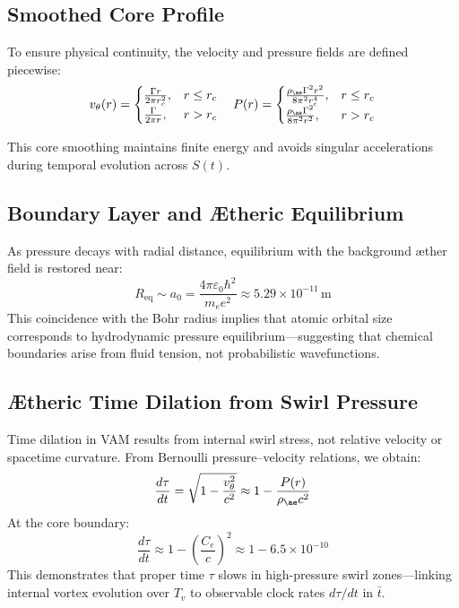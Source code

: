 \documentclass[12pt]{article}
\begin{document}
\subsection{Smoothed Core Profile}

To ensure physical continuity, the velocity and pressure fields are defined piecewise:
\[
v_\theta(r) =
\begin{cases}
\frac{\Gamma r}{2\pi r_c^2}, & r \leq r_c \\
\frac{\Gamma}{2\pi r}, & r > r_c
\end{cases}
\quad
P(r) =
\begin{cases}
\frac{\rho_{\ae} \Gamma^2 r^2}{8\pi^2 r_c^4}, & r \leq r_c \\
\frac{\rho_{\ae} \Gamma^2}{8\pi^2 r^2}, & r > r_c
\end{cases}
\]

This core smoothing maintains finite energy and avoids singular accelerations during temporal evolution across \( S(t) \).

\subsection{Boundary Layer and Ætheric Equilibrium}

As pressure decays with radial distance, equilibrium with the background æther field is restored near:
\[
R_{\text{eq}} \sim a_0 = \frac{4\pi \varepsilon_0 \hbar^2}{m_e e^2} \approx 5.29 \times 10^{-11} \, \text{m}
\]
This coincidence with the Bohr radius implies that atomic orbital size corresponds to hydrodynamic pressure equilibrium—suggesting that chemical boundaries arise from fluid tension, not probabilistic wavefunctions.

\subsection{Ætheric Time Dilation from Swirl Pressure}

Time dilation in VAM results from internal swirl stress, not relative velocity or spacetime curvature. From Bernoulli pressure–velocity relations, we obtain:
\[
\frac{d\tau}{dt} = \sqrt{1 - \frac{v_\theta^2}{c^2}} \approx 1 - \frac{P(r)}{\rho_{\ae} c^2}
\]
At the core boundary:
\[
\frac{d\tau}{dt} \approx 1 - \left( \frac{C_e}{c} \right)^2 \approx 1 - 6.5 \times 10^{-10}
\]
This demonstrates that proper time \( \tau \) slows in high-pressure swirl zones—linking internal vortex evolution over \( T_v \) to observable clock rates \( d\tau/dt \) in \( \bar{t} \).
\end{document}
